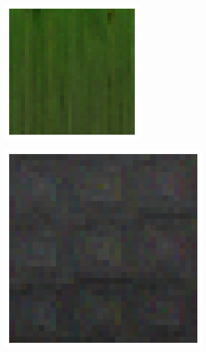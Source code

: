 \begin{itemize}
            \begin{figure}[H]
                \centering
                \begin{minipage}{0.30\textwidth}
                    \centering
                    \includegraphics[width=\textwidth]{imgs/GenExample2.png} 
                    \label{fig:GenExample2}
                \end{minipage}
                \hspace{0.05\textwidth} %
                \begin{minipage}{0.30\textwidth}
                    \centering
                    \includegraphics[width=\textwidth]{imgs/GenExample3.png} 

\end{minipage}
\end{figure}
\end{itemize}
